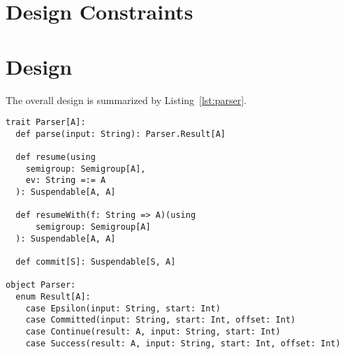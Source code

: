 \documentclass[sigplan,screen,review]{acmart}
\begin{document}
  \section{Design Constraints}

  \section{Design}

  The overall design is summarized by Listing~\ref{lst:parser}.


  \begin{lstlisting}[frame=lines, caption={The \texttt{Parser} type}, float=*, label=lst:parser]
trait Parser[A]:
  def parse(input: String): Parser.Result[A]

  def resume(using
    semigroup: Semigroup[A],
    ev: String =:= A
  ): Suspendable[A, A]

  def resumeWith(f: String => A)(using
      semigroup: Semigroup[A]
  ): Suspendable[A, A]

  def commit[S]: Suspendable[S, A]

object Parser:
  enum Result[A]:
    case Epsilon(input: String, start: Int)
    case Committed(input: String, start: Int, offset: Int)
    case Continue(result: A, input: String, start: Int)
    case Success(result: A, input: String, start: Int, offset: Int)
  \end{lstlisting}
\end{document}
